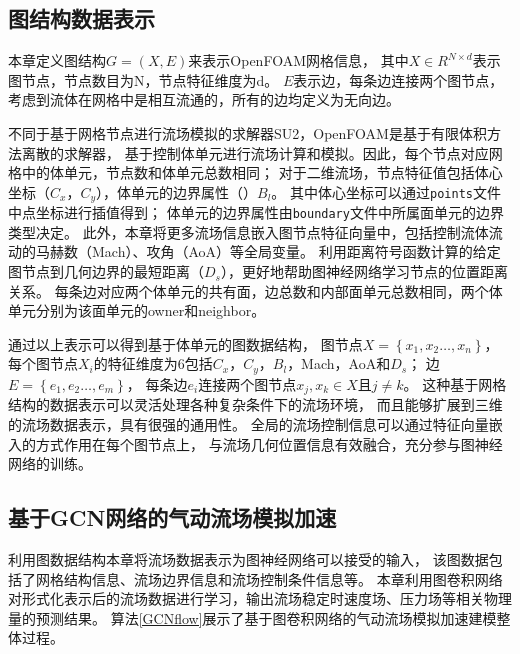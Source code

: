 \subsection{图结构数据表示}

本章定义图结构$G=\left(X, E\right)$来表示OpenFOAM网格信息，
其中$X \in R^{N \times d}$表示图节点，节点数目为N，节点特征维度为d。
$E$表示边，每条边连接两个图节点，考虑到流体在网格中是相互流通的，所有的边均定义为无向边。

不同于基于网格节点进行流场模拟的求解器SU2\cite{2015SU2}，OpenFOAM是基于有限体积方法离散的求解器，
基于控制体单元进行流场计算和模拟。因此，每个节点对应网格中的体单元，节点数和体单元总数相同；
对于二维流场，节点特征值包括体心坐标（$C_x$，$C_y$），体单元的边界属性（）$B_l$。
其中体心坐标可以通过\texttt{points}文件中点坐标进行插值得到；
体单元的边界属性由\texttt{boundary}文件中所属面单元的边界类型决定。
此外，本章将更多流场信息嵌入图节点特征向量中，包括控制流体流动的马赫数（Mach）、攻角（AoA）等全局变量。
利用距离符号函数计算的给定图节点到几何边界的最短距离（$D_s$），更好地帮助图神经网络学习节点的位置距离关系。
每条边对应两个体单元的共有面，边总数和内部面单元总数相同，两个体单元分别为该面单元的owner和neighbor。

通过以上表示可以得到基于体单元的图数据结构，
图节点$X=\left\{x_1, x_2 \ldots, x_n \right\}$，
每个图节点$X_i$的特征维度为6包括$C_x$，$C_y$，$B_l$，Mach，AoA和$D_s$；
边$E = \left\{e_1, e_2 \ldots, e_m \right\}$，
每条边$e_i$连接两个图节点$x_j,x_k \in X$且$j\not= k$。
这种基于网格结构的数据表示可以灵活处理各种复杂条件下的流场环境，
而且能够扩展到三维的流场数据表示，具有很强的通用性。
全局的流场控制信息可以通过特征向量嵌入的方式作用在每个图节点上，
与流场几何位置信息有效融合，充分参与图神经网络的训练。

\subsection{基于GCN网络的气动流场模拟加速}

利用图数据结构本章将流场数据表示为图神经网络可以接受的输入，
该图数据包括了网格结构信息、流场边界信息和流场控制条件信息等。
本章利用图卷积网络对形式化表示后的流场数据进行学习，输出流场稳定时速度场、压力场等相关物理量的预测结果。
算法\ref{GCNflow}展示了基于图卷积网络的气动流场模拟加速建模整体过程。


